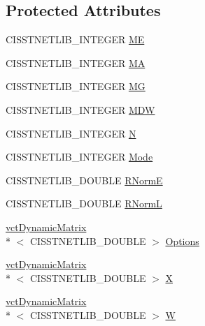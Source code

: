 \subsection*{Protected Attributes}
\begin{DoxyCompactItemize}
\item 
C\-I\-S\-S\-T\-N\-E\-T\-L\-I\-B\-\_\-\-I\-N\-T\-E\-G\-E\-R \hyperlink{classnmr_l_s_e_i_solver_a226c819beb87b1756570a1739f81ad16}{M\-E}
\item 
C\-I\-S\-S\-T\-N\-E\-T\-L\-I\-B\-\_\-\-I\-N\-T\-E\-G\-E\-R \hyperlink{classnmr_l_s_e_i_solver_a1cb20a6323aad18c24b11714180e21a6}{M\-A}
\item 
C\-I\-S\-S\-T\-N\-E\-T\-L\-I\-B\-\_\-\-I\-N\-T\-E\-G\-E\-R \hyperlink{classnmr_l_s_e_i_solver_ab3c2d56d8f5228ed1d724b333da52c0a}{M\-G}
\item 
C\-I\-S\-S\-T\-N\-E\-T\-L\-I\-B\-\_\-\-I\-N\-T\-E\-G\-E\-R \hyperlink{classnmr_l_s_e_i_solver_ab59ba7cd14b159254680495fb71955ee}{M\-D\-W}
\item 
C\-I\-S\-S\-T\-N\-E\-T\-L\-I\-B\-\_\-\-I\-N\-T\-E\-G\-E\-R \hyperlink{classnmr_l_s_e_i_solver_a7f1583416d76d07acaf011a855aa8e50}{N}
\item 
C\-I\-S\-S\-T\-N\-E\-T\-L\-I\-B\-\_\-\-I\-N\-T\-E\-G\-E\-R \hyperlink{classnmr_l_s_e_i_solver_a28cfc74149771e09948f019db3aee14f}{Mode}
\item 
C\-I\-S\-S\-T\-N\-E\-T\-L\-I\-B\-\_\-\-D\-O\-U\-B\-L\-E \hyperlink{classnmr_l_s_e_i_solver_a94ec18f12a4352c356ed0c802f2f0ced}{R\-Norm\-E}
\item 
C\-I\-S\-S\-T\-N\-E\-T\-L\-I\-B\-\_\-\-D\-O\-U\-B\-L\-E \hyperlink{classnmr_l_s_e_i_solver_aebb79a24226336ee09db4a7650ccfb75}{R\-Norm\-L}
\item 
\hyperlink{classvct_dynamic_matrix}{vct\-Dynamic\-Matrix}\\*
$<$ C\-I\-S\-S\-T\-N\-E\-T\-L\-I\-B\-\_\-\-D\-O\-U\-B\-L\-E $>$ \hyperlink{classnmr_l_s_e_i_solver_a543ee26ff54d6013059361219790c54b}{Options}
\item 
\hyperlink{classvct_dynamic_matrix}{vct\-Dynamic\-Matrix}\\*
$<$ C\-I\-S\-S\-T\-N\-E\-T\-L\-I\-B\-\_\-\-D\-O\-U\-B\-L\-E $>$ \hyperlink{classnmr_l_s_e_i_solver_ab5f8afa5ce2709553fb43e161f05273d}{X}
\item 
\hyperlink{classvct_dynamic_matrix}{vct\-Dynamic\-Matrix}\\*
$<$ C\-I\-S\-S\-T\-N\-E\-T\-L\-I\-B\-\_\-\-D\-O\-U\-B\-L\-E $>$ \hyperlink{classnmr_l_s_e_i_solver_ab4e958a8679e59284ab62db215533c67}{W}
\item 

\end{DoxyCompactItemize}
